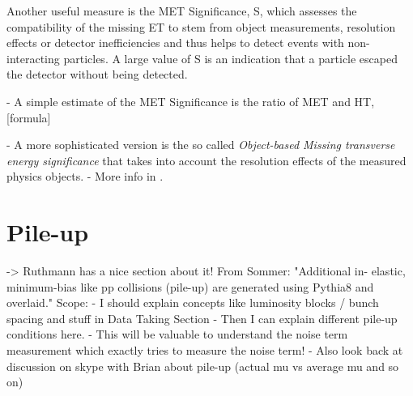 

Another useful measure is the MET Significance, S, which assesses the compatibility of the missing ET to stem from object measurements, resolution effects or detector inefficiencies and thus helps to detect events with non-interacting particles. 
A large value of S is an indication that a particle escaped the detector without being detected.

- A simple estimate of the MET Significance is the ratio of MET and HT, [formula]

- A more sophisticated version is the so called \emph{Object-based Missing transverse energy significance} that takes into account the resolution effects of the measured physics objects. 
- More info in \cite{ATLAS-CONF-2018-038}.



\section{Pile-up}


->  Ruthmann has a nice section about it!
From Sommer: "Additional in- elastic, minimum-bias like pp collisions (pile-up) are generated using Pythia8 and overlaid."
Scope:
- I should explain concepts like luminosity blocks  / bunch spacing and stuff in Data Taking Section
- Then I can explain different pile-up conditions here.
- This will be valuable to understand the noise term measurement which exactly tries to measure the noise term!
- Also look back at discussion on skype with Brian about pile-up (actual mu vs average mu and so on)
